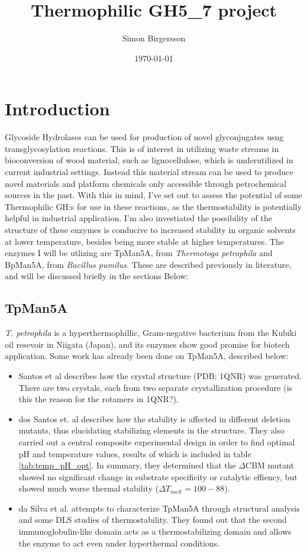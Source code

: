 \documentclass{article}
\title{Thermophilic GH5\_7 project}
\author{Simon Birgersson}
\date{\today}
\begin{document}
\maketitle

\section{Introduction}
Glycoside Hydrolases can be used for production of novel glyconjugates usng transglycosylation reactions. This is of interest in utilizing waste streams in bioconversion of wood material, such as lignocellulose, which is underutilized in current industrial settings. Instead this material stream can be used to produce novel materials and platform chemicals only accessible through petrochemical sources in the past. With this in mind, I've set out to assess the potential of some Thermophilic GH:s for use in these reactions, as the thermostability is potentially helpful in industrial application. I'm also investiated the possibility of the structure of these enzymes is conducive to increased stability in organic solvents at lower temperature, besides being more stable at higher temperatures. The enzymes I will be utlizing are TpMan5A, from \textit{Thermotoga petrophila} and BpMan5A, from \textit{Bacillus pumilus}. These are described previously in literature, and will be discussed briefly in the sections Below:

\subsection{TpMan5A}
\textit{T. petrophila} is a hyperthermophillic, Gram-negative bacterium from the Kubiki oil resevoir in Niigata (Japan), and its enzymes show good promise for biotech application. Some work has already been done on TpMan5A, described below:
\begin{itemize}
  \item Santos et al \cite{Santos2010} describes how the crystal structure (PDB: 1QNR) was generated. There are two crystals, each from two separate crystallization procedure (is this the reason for the rotamers in 1QNR?).

  \item dos Santos et. al \cite{DosSantos2012} describes how the stability is affected in different deletion mutants, thus elucidating stabilizing elements in the structure. They also carried out a central composite experimental design in order to find optimal pH and temperature values, results of which is included in table \ref{tab:temp_pH_opt}. In summary, they determined that the $\Delta$CBM mutant showed no significant change in substrate specificity or catalytic effiency, but showed much worse thermal stability ($\Delta T_{melt}=100-88$).

    \item da Silva et al. \cite{DaSilva2020} attempts to characterize TpMan5A through structural analysis and some DLS studies of thermostability. They found out that the second immunoglobulin-like domain acts as a thermostabilizing domain and allows the enzyme to act even under hyperthermal conditions.
\end{itemize}
\end{document}
